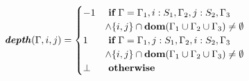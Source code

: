 \[\begin{array}{c}
    \textbf{\textit{depth}}(\Gamma, i, j) =
        \begin{cases}
            -1   & \ \textbf{if}\  \Gamma = \Gamma_1, i: S_1, \Gamma_2, j: S_2, \Gamma_3 \\
                 & \wedge \{i, j\} \cap \textbf{dom}(\Gamma_1 \cup \Gamma_2 \cup
                   \Gamma_3) \neq \emptyset \\
            1    & \ \textbf{if}\  \Gamma = \Gamma_1, j: S_1, \Gamma_2, i: S_2, \Gamma_3 \\
                 & \wedge \{i, j\} \cap \textbf{dom}(\Gamma_1 \cup \Gamma_2 \cup
                   \Gamma_3) \neq \emptyset \\
            \bot & \ \textbf{otherwise}
        \end{cases}
\end{array}\]

